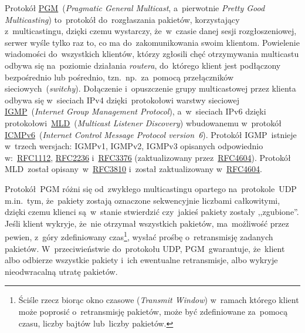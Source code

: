 \documentclass[thesis]{subfiles}
\begin{document}
Protokół \href{https://tools.ietf.org/html/rfc3208}{PGM}~(\emph{Pragmatic General Multicast}, a~pierwotnie \emph{Pretty Good Multicasting}) to~protokół do~rozgłaszania pakietów, korzystający z~multicastingu, dzięki czemu wystarczy, że~w~czasie danej sesji rozgłoszeniowej, serwer wyśle tylko raz to, co ma do~zakomunikowania swoim klientom. Powielenie wiadomości do~wszystkich klientów, którzy zgłosili chęć otrzymywania multicastu odbywa się na~poziomie działania \emph{routera}, do~którego klient jest podłączony bezpośrednio lub pośrednio, tzn.~np.~za~pomocą przełączników sieciowych~(\emph{switchy}). Dołączenie i~opuszczenie grupy multicastowej przez klienta odbywa się w~sieciach IPv4 dzięki~protokołowi warstwy sieciowej \href{https://en.wikipedia.org/wiki/Internet_Group_Management_Protocol}{IGMP}~(\emph{Internet Group Management Protocol}), a~w~sieciach IPv6 dzięki protokołowi~\href{https://en.wikipedia.org/wiki/Multicast_Listener_Discovery}{MLD}~(\emph{Multicast Listener Discovery}) wbudowanemu w~protokół \href{https://en.wikipedia.org/wiki/Internet_Control_Message_Protocol_version_6}{ICMPv6}~(\emph{Internet Control Message Protocol version~6}). Protokół IGMP~istnieje w~trzech wersjach: IGMPv1, IGMPv2, IGMPv3 opisanych odpowiednio w:~\href{https://tools.ietf.org/html/rfc1112}{RFC1112}, \href{https://tools.ietf.org/html/rfc2236}{RFC2236} i~\href{https://tools.ietf.org/html/rfc3376}{RFC3376} (zaktualizowany przez~\href{https://tools.ietf.org/html/rfc4604}{RFC4604}). Protokół MLD~został opisany~w~\href{https://tools.ietf.org/html/rfc3810}{RFC3810} i~został zaktualizowany w~\href{https://tools.ietf.org/html/rfc4604}{RFC4604}.

Protokół~PGM różni się od~zwykłego multicastingu opartego na~protokole~UDP m.in.~tym, że~pakiety zostają oznaczone sekwencyjnie liczbami całkowitymi, dzięki czemu klienci są~w~stanie stwierdzić czy~jakieś pakiety zostały ,,zgubione''. Jeśli klient wykryje, że~nie otrzymał wszystkich pakietów, ma~możliwość przez pewien, z~góry zdefiniowany czas\footnote{Ściśle rzecz biorąc okno czasowe (\emph{Transmit Window}) w~ramach którego klient może poprosić o~retransmisję pakietów, może być zdefiniowane za~pomocą czasu, liczby bajtów lub~liczby pakietów.}, wysłać prośbę o~retransmisję zadanych pakietów. W~przeciwieństwie do~protokołu UDP, PGM~gwarantuje, że~klient albo odbierze wszystkie pakiety i~ich ewentualne retransmisje, albo wykryje nieodwracalną utratę pakietów.
\end{document}
